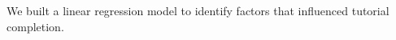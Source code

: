 
\subsection{\rqlearning}

We built a linear regression model to identify factors that influenced tutorial completion.

